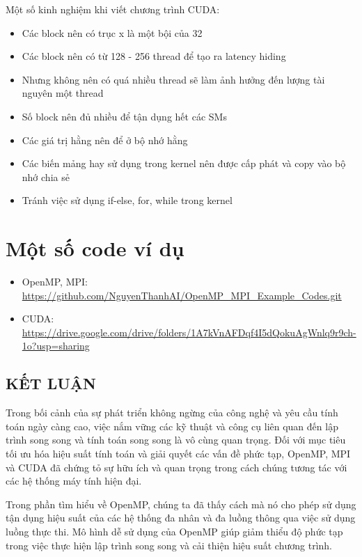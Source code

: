 \documentclass[14pt, a4paper]{article}
\numberwithin{equation}{section}
\numberwithin{figure}{section}
\numberwithin{dl}{section}
\numberwithin{md}{section}
\numberwithin{bd}{section}
\numberwithin{dn}{section}
\numberwithin{hq}{section}
\begin{document}
Một số kinh nghiệm khi viết chương trình CUDA:

\begin{itemize}
    \item Các block nên có trục x là một bội của 32
    \item Các block nên có từ 128 - 256 thread để tạo ra latency hiding
    \item Nhưng không nên có quá nhiều thread sẽ làm ảnh hưởng đến lượng tài nguyên một thread
    \item Số block nên đủ nhiều để tận dụng hết các SMs
    \item Các giá trị hằng nên để ở bộ nhớ hằng
    \item Các biến mảng hay sử dụng trong kernel nên được cấp phát và copy vào bộ nhớ chia sẻ
    \item Tránh việc sử dụng if-else, for, while trong kernel 
\end{itemize}

\section{Một số code ví dụ}

\begin{itemize}
    \item OpenMP, MPI: \url{https://github.com/NguyenThanhAI/OpenMP_MPI_Example_Codes.git}
    \item CUDA: \url{https://drive.google.com/drive/folders/1A7kVnAFDqf4I5dQokuAgWnlq9r9ch-1o?usp=sharing}
\end{itemize}

\newpage
\begin{center}
    \section*{KẾT LUẬN}
\end{center}

Trong bối cảnh của sự phát triển không ngừng của công nghệ và yêu cầu tính toán ngày càng cao, việc nắm vững các kỹ thuật và công cụ liên quan đến lập trình song song và tính toán song song là vô cùng quan trọng. Đối với mục tiêu tối ưu hóa hiệu suất tính toán và giải quyết các vấn đề phức tạp, OpenMP, MPI và CUDA đã chứng tỏ sự hữu ích và quan trọng trong cách chúng tương tác với các hệ thống máy tính hiện đại.

Trong phần tìm hiểu về OpenMP, chúng ta đã thấy cách mà nó cho phép sử dụng tận dụng hiệu suất của các hệ thống đa nhân và đa luồng thông qua việc sử dụng luồng thực thi. Mô hình dễ sử dụng của OpenMP giúp giảm thiểu độ phức tạp trong việc thực hiện lập trình song song và cải thiện hiệu suất chương trình.
\end{document}
